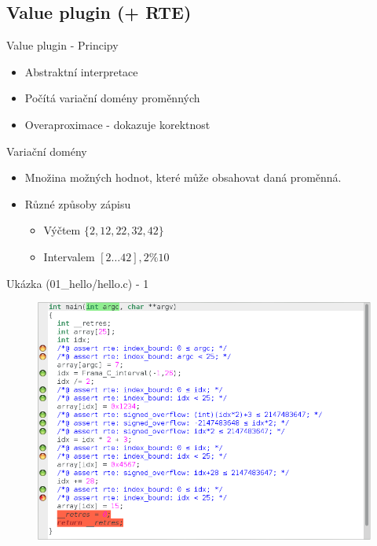 \documentclass[11pt]{beamer}
\begin{document}
\subsection{Value plugin (+ RTE)}

\begin{frame}{Value plugin - Principy}
	\begin{itemize}
			\item Abstraktní interpretace
			\item Počítá variační domény proměnných
			\item Overaproximace - dokazuje korektnost
	\end{itemize}
\end{frame}

\begin{frame}{Variační domény}
	\begin{itemize}
			\item Množina možných hodnot, které může obsahovat daná proměnná.
			\item Různé způsoby zápisu
			\begin{itemize}
				\item Výčtem \( \{ 2, 12, 22, 32, 42 \} \)
				\item Intervalem \( [2 \ldots 42], 2 \% 10 \)
			\end{itemize}
	\end{itemize}
\end{frame}

\begin{frame}{Ukázka (01\_hello/hello.c) - 1}
	\begin{figure}
		\includegraphics[scale=0.3]{./img/value_01.png}
	\end{figure}
\end{frame}
\end{document}
